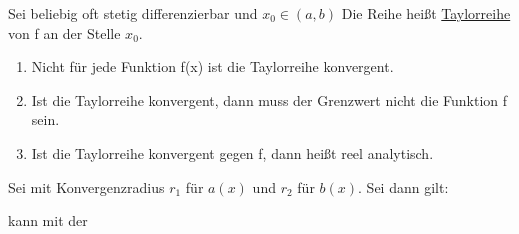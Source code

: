 \documentclass{../tudscript}
\begin{document}
            Sei
            beliebig oft stetig differenzierbar und $x_0 \in (a, b)$
            Die Reihe
            heißt \underline{Taylorreihe} von f an der Stelle $x_0$.
        \begin{enumerate}
            \item Nicht für jede Funktion f(x) ist die Taylorreihe konvergent.
            \item Ist die Taylorreihe konvergent, dann muss der Grenzwert nicht die Funktion f sein.
            \item Ist die Taylorreihe konvergent gegen f, dann heißt
                reel analytisch.
        \end{enumerate} 
        Sei
        mit Konvergenzradius $r_1$ für $a(x)$ und $r_2$ für $b(x)$.
        Sei 
        dann gilt:

        kann mit der %
\end{document}
